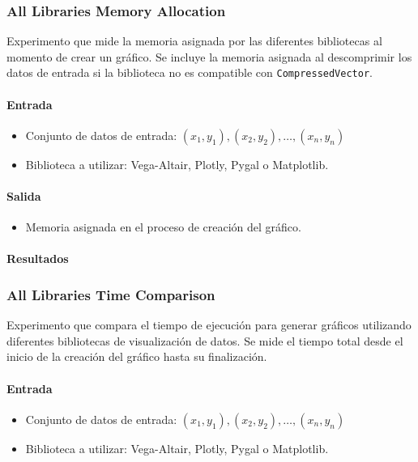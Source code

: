 \subsubsection{All Libraries Memory Allocation}
\label{all_libraries_memory_allocation}

Experimento que mide la memoria asignada por las diferentes bibliotecas al momento de crear un gráfico. Se incluye la memoria asignada al descomprimir los datos de entrada si la biblioteca no es compatible con \texttt{CompressedVector}.

\paragraph{Entrada}
\begin{itemize}
    \item Conjunto de datos de entrada: \( (x_1, y_1), (x_2, y_2), \ldots, (x_n, y_n) \)
    \item Biblioteca a utilizar: Vega-Altair, Plotly, Pygal o Matplotlib.
\end{itemize}

\paragraph{Salida}
\begin{itemize}
    \item Memoria asignada en el proceso de creación del gráfico.
\end{itemize}

\paragraph{Resultados}
\vspace{0.5em}
\noindent

\AllLibrariesMemoryAllocation

\subsubsection{All Libraries Time Comparison}
\label{all_libraries_time_comparison}

Experimento que compara el tiempo de ejecución para generar gráficos utilizando diferentes bibliotecas de visualización de datos. Se mide el tiempo total desde el inicio de la creación del gráfico hasta su finalización.

\paragraph{Entrada}
\begin{itemize}
    \item Conjunto de datos de entrada: \( (x_1, y_1), (x_2, y_2), \ldots, (x_n, y_n) \)
    \item Biblioteca a utilizar: Vega-Altair, Plotly, Pygal o Matplotlib.
\end{itemize}

